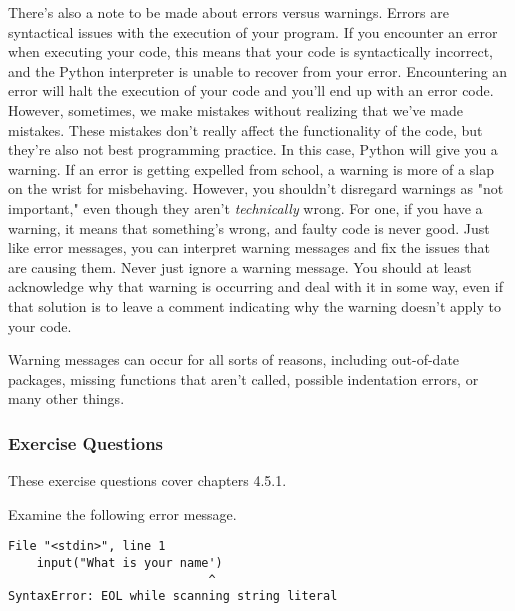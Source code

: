 There's also a note to be made about errors versus warnings. Errors are syntactical issues with the execution of your program. If you encounter an error when executing your code, this means that your code is syntactically incorrect, and the Python interpreter is unable to recover from your error. Encountering an error will halt the execution of your code and you'll end up with an error code. However, sometimes, we make mistakes without realizing that we've made mistakes. These mistakes don't really affect the functionality of the code, but they're also not best programming practice. In this case, Python will give you a warning. If an error is getting expelled from school, a warning is more of a slap on the wrist for misbehaving. However, you shouldn't disregard warnings as "not important," even though they aren't \textit{technically} wrong. For one, if you have a warning, it means that something's wrong, and faulty code is never good. Just like error messages, you can interpret warning messages and fix the issues that are causing them. Never just ignore a warning message. You should at least acknowledge why that warning is occurring and deal with it in some way, even if that solution is to leave a comment indicating why the warning doesn't apply to your code.\par
{}
Warning messages can occur for all sorts of reasons, including out-of-date packages, missing functions that aren't called, possible indentation errors, or many other things.
\subsubsection*{Exercise Questions}
These exercise questions cover chapters 4.5.1.
\begin{Exercise}
\end{Exercise}
\begin{Exercise}
    Examine the following error message.
    \begin{lstlisting}[style=none]
File "<stdin>", line 1
    input("What is your name')
                            ^
SyntaxError: EOL while scanning string literal
    \end{lstlisting}
\end{Exercise}
